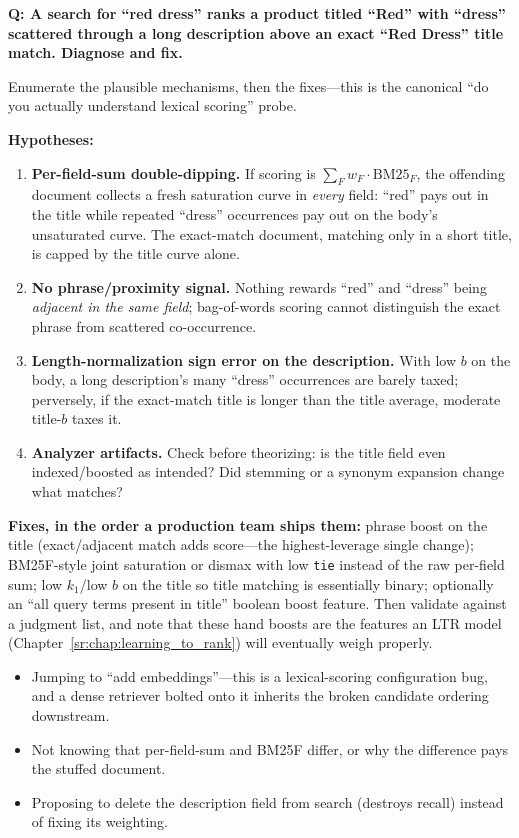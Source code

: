 \begin{interviewq}
\textbf{Q: A search for ``red dress'' ranks a product titled ``Red'' with ``dress'' scattered through a long description above an exact ``Red Dress'' title match. Diagnose and fix.}

 \quad {} \quad \badgefreq{\freqmed}

\stronganswer

Enumerate the plausible mechanisms, then the fixes---this is the canonical ``do you actually understand lexical scoring'' probe.

\textbf{Hypotheses:}
\begin{enumerate}
    \item \textbf{Per-field-sum double-dipping.} If scoring is $\sum_F w_F \cdot \text{BM25}_F$, the offending document collects a fresh saturation curve in \emph{every} field: ``red'' pays out in the title while repeated ``dress'' occurrences pay out on the body's unsaturated curve. The exact-match document, matching only in a short title, is capped by the title curve alone.
    \item \textbf{No phrase/proximity signal.} Nothing rewards ``red'' and ``dress'' being \emph{adjacent in the same field}; bag-of-words scoring cannot distinguish the exact phrase from scattered co-occurrence.
    \item \textbf{Length-normalization sign error on the description.} With low $b$ on the body, a long description's many ``dress'' occurrences are barely taxed; perversely, if the exact-match title is longer than the title average, moderate title-$b$ taxes it.
    \item \textbf{Analyzer artifacts.} Check before theorizing: is the title field even indexed/boosted as intended? Did stemming or a synonym expansion change what matches?
\end{enumerate}

\textbf{Fixes, in the order a production team ships them:} phrase boost on the title (exact/adjacent match adds score---the highest-leverage single change); BM25F-style joint saturation or dismax with low \texttt{tie} instead of the raw per-field sum; low $k_1$/low $b$ on the title so title matching is essentially binary; optionally an ``all query terms present in title'' boolean boost feature. Then validate against a judgment list, and note that these hand boosts are the features an LTR model (Chapter~\ref{sr:chap:learning_to_rank}) will eventually weigh properly.

\redflags
\begin{itemize}
    \item Jumping to ``add embeddings''---this is a lexical-scoring configuration bug, and a dense retriever bolted onto it inherits the broken candidate ordering downstream.
    \item Not knowing that per-field-sum and BM25F differ, or why the difference pays the stuffed document.
    \item Proposing to delete the description field from search (destroys recall) instead of fixing its weighting.
\end{itemize}


\end{interviewq}
